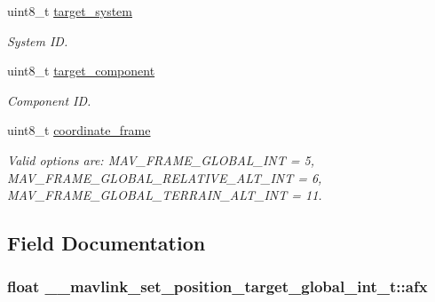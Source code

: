 \begin{DoxyCompactItemize}
uint8\+\_\+t \hyperlink{struct____mavlink__set__position__target__global__int__t_a975e3630a918eccf492709d4c99a32c0}{target\+\_\+system}
\begin{DoxyCompactList}\small\item\em System I\+D. \end{DoxyCompactList}\item 
uint8\+\_\+t \hyperlink{struct____mavlink__set__position__target__global__int__t_af0b1819138c66edaf4451246f79781d2}{target\+\_\+component}
\begin{DoxyCompactList}\small\item\em Component I\+D. \end{DoxyCompactList}\item 
uint8\+\_\+t \hyperlink{struct____mavlink__set__position__target__global__int__t_a50a2151a8837203dc04d2c22899bc6bb}{coordinate\+\_\+frame}
\begin{DoxyCompactList}\small\item\em Valid options are\+: M\+A\+V\+\_\+\+F\+R\+A\+M\+E\+\_\+\+G\+L\+O\+B\+A\+L\+\_\+\+I\+N\+T = 5, M\+A\+V\+\_\+\+F\+R\+A\+M\+E\+\_\+\+G\+L\+O\+B\+A\+L\+\_\+\+R\+E\+L\+A\+T\+I\+V\+E\+\_\+\+A\+L\+T\+\_\+\+I\+N\+T = 6, M\+A\+V\+\_\+\+F\+R\+A\+M\+E\+\_\+\+G\+L\+O\+B\+A\+L\+\_\+\+T\+E\+R\+R\+A\+I\+N\+\_\+\+A\+L\+T\+\_\+\+I\+N\+T = 11. \end{DoxyCompactList}\end{DoxyCompactItemize}


\subsection{Field Documentation}
\hypertarget{struct____mavlink__set__position__target__global__int__t_ac35a1928d17680654f3342905ae2755e}{
\subsubsection[{afx}]{\setlength{\rightskip}{0pt plus 5cm}float \+\_\+\+\_\+mavlink\+\_\+set\+\_\+position\+\_\+target\+\_\+global\+\_\+int\+\_\+t\+::afx}}\label{struct____mavlink__set__position__target__global__int__t_ac35a1928d17680654f3342905ae2755e}


